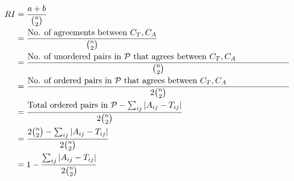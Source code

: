 \documentclass[11pt,a4paper]{article}
\begin{document}
\begin{align*}
    RI &= \frac{a+b}{\binom{n}{2}} \\
    &= \frac{\text{No. of agreements between } C_T,C_A}{\binom{n}{2}} \\
    &= \frac{\parbox{0.9\linewidth}{No. of unordered pairs in $\mathcal{P}$ that agrees between $C_T,C_A$}}{\binom{n}{2}} \\
    &= \frac{\parbox{0.9\linewidth}{No. of ordered pairs in $\mathcal{P}$ that agrees between $C_T,C_A$}}{2\binom{n}{2}} \\
    &= \frac{\text{Total ordered pairs in $\mathcal{P}$}-\sum_{ij} |A_{ij}-T_{ij}|}{2\binom{n}{2}} \\
    &= \frac{2\binom{n}{2}-\sum_{ij} |A_{ij}-T_{ij}|}{2\binom{n}{2}} \\
    &= 1-\frac{\sum_{ij} |A_{ij}-T_{ij}|}{2\binom{n}{2}}
\end{align*}
\end{document}
